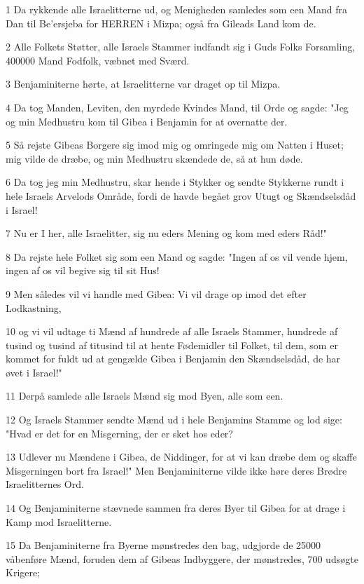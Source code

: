 \par 1 Da rykkende alle Israelitterne ud, og Menigheden samledes som een Mand fra Dan til Be'ersjeba for HERREN i Mizpa; også fra Gileads Land kom de.
\par 2 Alle Folkets Støtter, alle Israels Stammer indfandt sig i Guds Folks Forsamling, 400000 Mand Fodfolk, væbnet med Sværd.
\par 3 Benjaminiterne hørte, at Israelitterne var draget op til Mizpa.
\par 4 Da tog Manden, Leviten, den myrdede Kvindes Mand, til Orde og sagde: "Jeg og min Medhustru kom til Gibea i Benjamin for at overnatte der.
\par 5 Så rejste Gibeas Borgere sig imod mig og omringede mig om Natten i Huset; mig vilde de dræbe, og min Medhustru skændede de, så at hun døde.
\par 6 Da tog jeg min Medhustru, skar hende i Stykker og sendte Stykkerne rundt i hele Israels Arvelods Område, fordi de havde begået grov Utugt og Skændselsdåd i Israel!
\par 7 Nu er I her, alle Israelitter, sig nu eders Mening og kom med eders Råd!"
\par 8 Da rejste hele Folket sig som een Mand og sagde: "Ingen af os vil vende hjem, ingen af os vil begive sig til sit Hus!
\par 9 Men således vil vi handle med Gibea: Vi vil drage op imod det efter Lodkastning,
\par 10 og vi vil udtage ti Mænd af hundrede af alle Israels Stammer, hundrede af tusind og tusind af titusind til at hente Fødemidler til Folket, til dem, som er kommet for fuldt ud at gengælde Gibea i Benjamin den Skændselsdåd, de har øvet i Israel!"
\par 11 Derpå samlede alle Israels Mænd sig mod Byen, alle som een.
\par 12 Og Israels Stammer sendte Mænd ud i hele Benjamins Stamme og lod sige: "Hvad er det for en Misgerning, der er sket hos eder?
\par 13 Udlever nu Mændene i Gibea, de Niddinger, for at vi kan dræbe dem og skaffe Misgerningen bort fra Israel!" Men Benjaminiterne vilde ikke høre deres Brødre Israelitternes Ord.
\par 14 Og Benjaminiterne stævnede sammen fra deres Byer til Gibea for at drage i Kamp mod Israelitterne.
\par 15 Da Benjaminiterne fra Byerne mønstredes den bag, udgjorde de 25000 våbenføre Mænd, foruden dem af Gibeas Indbyggere, der mønstredes, 700 udsøgte Krigere;
